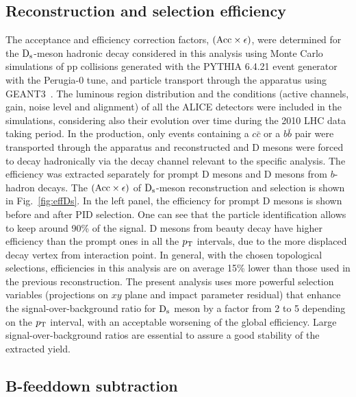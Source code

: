 \subsection{Reconstruction and selection efficiency}
The acceptance and efficiency correction factors, 
$(\rm Acc \times \epsilon)$, were determined for the ${\rm D_s}$-meson
hadronic decay considered in this analysis using Monte Carlo simulations 
of pp collisions generated with the PYTHIA 6.4.21 event generator~\cite{Sjostrand:2006za} with the 
Perugia-0 tune\cite{Skands:2010ak}, and particle transport through the apparatus 
using GEANT3~\cite{Brun:1994aa}.
The luminous region distribution and the conditions (active channels, gain, 
noise level and alignment) of all the ALICE detectors were included in the 
simulations, considering also their evolution over time during the 2010 LHC 
data taking period.
In the production, only events containing a $c\bar{c}$ or a $b\bar{b}$ pair 
were transported through the apparatus and reconstructed and
D mesons were forced to decay hadronically via the decay channel relevant to
the specific analysis.
The efficiency was extracted separately for prompt D mesons and D mesons 
from $b$-hadron decays.
The $(\rm Acc \times \epsilon)$ of ${\rm D_s}$-meson reconstruction and
selection is shown in Fig.~\ref{fig:effDs}. In the left panel, the efficiency 
for prompt D mesons is shown before and after PID 
selection. One can see that the particle identification allows to keep 
around 90\% of the signal. D mesons from beauty decay 
have higher efficiency than
the prompt ones in all the $p_{\rm T}$ intervals, due to the more displaced 
decay vertex from interaction point.
In general, with the chosen topological selections, efficiencies in this analysis
are on average 15\% lower than those used in the previous reconstruction. 
The present analysis uses more powerful selection variables 
(projections on $xy$ plane and impact parameter residual) that
enhance the signal-over-background ratio for ${\rm D_s}$ meson by a factor 
from 2 to 5 depending on the $p_{\rm T}$ interval, with an acceptable worsening
of the global efficiency. Large signal-over-background ratios are essential 
to assure a good stability of the extracted yield.

\subsection{B-feeddown subtraction}

